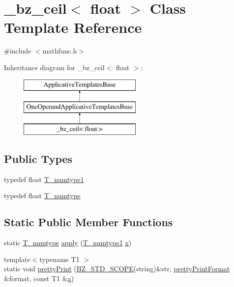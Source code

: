 \hypertarget{class__bz__ceil_3_01float_01_4}{}\section{\+\_\+bz\+\_\+ceil$<$ float $>$ Class Template Reference}
\label{class__bz__ceil_3_01float_01_4}


{\ttfamily \#include $<$mathfunc.\+h$>$}

Inheritance diagram for \+\_\+bz\+\_\+ceil$<$ float $>$\+:\begin{figure}[H]
\begin{center}
\leavevmode
\includegraphics[height=3.000000cm]{class__bz__ceil_3_01float_01_4}
\end{center}
\end{figure}
\subsection*{Public Types}
\begin{DoxyCompactItemize}
\item 
typedef float \hyperlink{class__bz__ceil_3_01float_01_4_a6b9407a53ce84b04732f735d52c91166}{T\+\_\+numtype1}
\item 
typedef float \hyperlink{class__bz__ceil_3_01float_01_4_af4bab9f24e6f6e041776508ea4f42792}{T\+\_\+numtype}
\end{DoxyCompactItemize}
\subsection*{Static Public Member Functions}
\begin{DoxyCompactItemize}
\item 
static \hyperlink{class__bz__ceil_3_01float_01_4_af4bab9f24e6f6e041776508ea4f42792}{T\+\_\+numtype} \hyperlink{class__bz__ceil_3_01float_01_4_a2ddc2bf5e63bff81addb06f86a16b8f6}{apply} (\hyperlink{class__bz__ceil_3_01float_01_4_a6b9407a53ce84b04732f735d52c91166}{T\+\_\+numtype1} \hyperlink{vecnorm1_8cc_ac73eed9e41ec09d58f112f06c2d6cb63}{x})
\item 
{\footnotesize template$<$typename T1 $>$ }\\static void \hyperlink{class__bz__ceil_3_01float_01_4_ad54f4e673e61a758c54e25fafc86104a}{pretty\+Print} (\hyperlink{numinquire_8h_a2b24ffc3b4ef9803956bc7715c6c7b83}{B\+Z\+\_\+\+S\+T\+D\+\_\+\+S\+C\+O\+P\+E}(string)\&str, \hyperlink{classprettyPrintFormat}{pretty\+Print\+Format} \&format, const T1 \&\hyperlink{gen__mat5files_8m_aae328bf20413f220e38aec4d95bfd6da}{a})
\end{DoxyCompactItemize}


